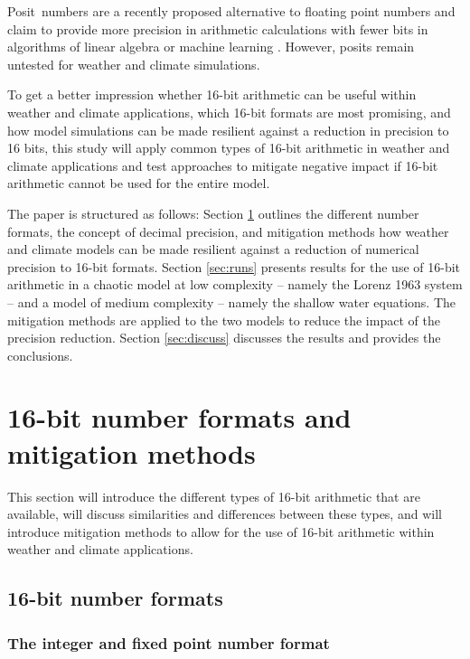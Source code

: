 \documentclass[draft]{agujournal2019}
\begin{document}
Posit\texttrademark ~numbers are a recently proposed alternative to floating point numbers and claim to provide more precision in arithmetic calculations with fewer bits in algorithms of linear algebra or machine learning \cite{Gustafson2017,Langroudi2019}. However, posits remain untested for weather and climate simulations.

To get a better impression whether 16-bit arithmetic can be useful within weather and climate applications, which 16-bit formats are most promising, and how model simulations can be made resilient against a reduction in precision to 16 bits, this study will apply common types of 16-bit arithmetic in weather and climate applications and test approaches to mitigate negative impact if 16-bit arithmetic cannot be used for the entire model.

The paper is structured as follows: Section \ref{sec:formats} outlines the different number formats, the concept of decimal precision, and mitigation methods how weather and climate models can be made resilient against a reduction of numerical precision to 16-bit formats. Section \ref{sec:runs} presents results for the use of 16-bit arithmetic in a chaotic model at low complexity -- namely the Lorenz 1963 system -- and a model of medium complexity -- namely the shallow water equations. The mitigation methods are applied to the two models to reduce the impact of the precision reduction. Section \ref{sec:discuss} discusses the results and provides the conclusions.


\section{16-bit number formats and mitigation methods}
\label{sec:formats}

This section will introduce the different types of 16-bit arithmetic that are available, will discuss similarities and differences between these types, and will introduce mitigation methods to allow for the use of 16-bit arithmetic within weather and climate applications.

\subsection{16-bit number formats}

\subsubsection{The integer and fixed point number format}
\label{sec:integer}
\end{document}
